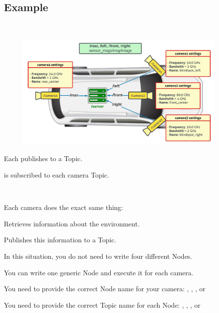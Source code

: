 \documentclass[usenames,11,dvipsnames,svgnames,x11names,aspectratio=1610,bibref]{beamer}
\newcommand{\sectionColor}[1]{\textcolor{sectionchevron}{#1}}
\newcommand{\mydisclaimer}{{\color{disclaimer}{\footnotesize Lecture 5~}}}
\newcommand\secsec{\cnordSix{\secname}~\sectionColor{\small\faChevronRight}~{\cnordFive{\small\subsecname}\hfill\mydisclaimer}}
\begin{document}
\subsection{Example}
\begin{frame}[fragile]{\secsec}
\vspace*{\fill}

\begin{figure}
    \centering
    \includegraphics[width=10.5cm]{figures/lecture5/av.jpeg}
\end{figure}

\begin{compactitem}
    \small
    \item Each  publishes  to a Topic.
    \item {} is subscribed to each camera Topic.
\end{compactitem}
\vspace*{\fill}
\end{frame}


\begin{frame}[fragile]{\secsec}
\vspace*{\fill}
\begin{compactitem}
    \item Each camera does the exact same thing:
    \begin{compactenum}
    \item Retrieves information about the environment.
    \item Publishes this information to a Topic.
    \end{compactenum}

\item In this situation, you do not need to write four different  Nodes.
\item You can write one generic Node and execute it for each camera.
\begin{compactitem}
    \item You need to provide the correct Node name for your camera: , , , or 
    \item You need to provide the correct Topic name for each Node: , , , or 
\end{compactitem}
\end{compactitem}
\vspace*{\fill}
\end{frame}
\end{document}
